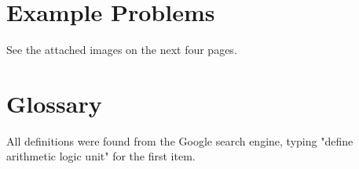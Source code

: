 \documentclass[12pt]{article}
\numberwithin{figure}{subsection}
\numberwithin{table}{subsection}
\numberwithin{equation}{subsection}
\begin{document}
\section{Example Problems}

See the attached images on the next four pages.

% 

\section{Glossary}

All definitions were found from the Google search engine, typing "define arithmetic logic unit" for the first item.
\end{document}
